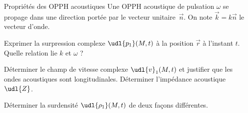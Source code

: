 
\begin{exo}[PC][1][TD]{Propriétés des OPPH acoustiques}
    Une OPPH acoustique de pulsation $\omega$ se propage dans une direction portée par le vecteur unitaire~$\Vec{n}$. On note $\Vec{k} = k \Vec{n}$ le vecteur d’onde.
    \begin{quest}
        \item Exprimer la surpression complexe $\udl{p_1}(M,t)$ à la position $\Vec{r}$ à l’instant $t$. Quelle relation lie $k$ et $\omega$ ?
        \item Déterminer le champ de vitesse complexe $\udl{v}_1(M,t)$ et justifier que les ondes acoustiques sont longitudinales. Déterminer l’impédance acoustique $\udl{Z}$.
        \item Déterminer la surdensité $\udl{\rho_1}(M,t)$ de deux façons différentes.
    \end{quest}

\end{exo}


